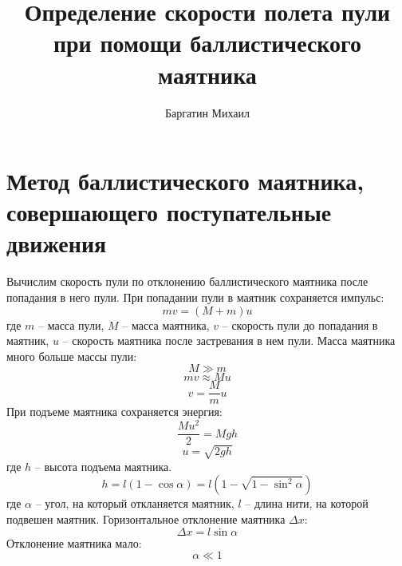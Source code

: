\documentclass{article}
\title{Определение скорости полета пули при помощи баллистического маятника}
\date{}
\author{Баргатин Михаил}
\begin{document}
    \maketitle
    \newpage

    \section{Метод баллистического маятника, совершающего поступательные движения}

    Вычислим скорость пули по отклонению баллистического маятника после попадания в него пули.
    \newline
    При попадании пули в маятник сохраняется импульс:
    \begin{equation}
        mv = (M + m)u
    \end{equation}
    где $m$ -- масса пули, $M$ -- масса маятника, $v$ -- скорость пули до попадания в маятник,
    $u$ -- скорость маятника после застревания в нем пули.
    \newline
    Масса маятника много больше массы пули:
    \begin{equation}
        M \gg m
    \end{equation}
    \begin{equation}
        mv \approx Mu
    \end{equation}
    \begin{equation}
        v = \frac{M}{m}u
    \end{equation}
    При подъеме маятника сохраняется энергия:
    \begin{equation}
        \frac{Mu^2}{2} = Mgh
    \end{equation}
    \begin{equation}
        u = \sqrt{2gh}
    \end{equation}
    где $h$ -- высота подъема маятника.
    \newline
    \begin{equation}
        h = l(1 - \cos \alpha) = l(1 - \sqrt{1-\sin^2\alpha})
    \end{equation}
    где $\alpha$ -- угол, на который откланяется маятник, $l$ -- длина нити, на которой подвешен маятник.
    \newline
    Горизонтальное отклонение маятника $\Delta x$:
    \begin{equation}
        \Delta x = l\sin\alpha
    \end{equation}
    Отклонение маятника мало:
    \begin{equation}
        \alpha \ll 1
    \end{equation}
\end{document}

